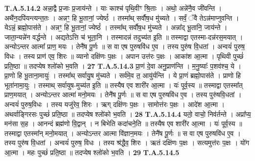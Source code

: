 \documentclass[17pt]{extarticle}
\begin{document}
                  \newline
                                                                  \textbf{ T.A.5.14.2} \newline
                  अन्ना॒द्वै प्र॒जाः प्र॒जाय॑न्ते । याः काश्च॑ पृथि॒वीꣳ श्रि॒ताः । अथो॒ अन्ने॑नै॒व जी॑वन्ति । अथै॑न॒दपि॑यन्त्यन्त॒तः । अन्नꣳ॒॒ हि भू॒तानां॒ ज्येष्ठं᳚ । तस्मा᳚थ् सर्वौष॒ध मु॑च्यते ।  सर्वं॒ ॅवै तेऽन्न॑माप्नुवन्ति । येऽन्नं॒ ब्रह्मो॒पास॑ते । अन्नꣳ॒॒ हि भू॒तानां॒ ज्येष्ठं᳚ । तस्मा᳚थ् सर्वौष॒ध मु॑च्यते । अन्ना᳚द् भू॒तानि॒ जाय॑न्ते । जाता॒न्यन्ने॑न वर्द्धन्ते ।  अद्यतेऽत्ति च॑ भूता॒नि । तस्मादन्नं तदुच्य॑त इ॒ति ॥  तस्माद्वा एतस्मा-दन्न॑रस॒मयात् ।  अन्योऽन्तर आत्मा᳚ प्राण॒ मयः । तेनै॑ष पू॒र्णः ॥  स वा एष पुरुषवि॑ध ए॒व । तस्य पुरु॑ष वि॒धतां ।  अन्वयं॑ पुरुष॒ विधः । तस्य प्राण॑ एव॒ शिरः ॥  व्यानो दक्षि॑णः प॒क्षः । अपान उत्त॑रः प॒क्षः ।  आका॑श आ॒त्मा । पृथिवी पुच्छं॑ प्रति॒ष्ठा ॥  तदप्येष श्लो॑को भ॒वति । \textbf{ 27} \newline
                  \newline
                                                                  \textbf{ T.A.5.14.3} \newline
                  प्रा॒णं दे॒वा अनु॒प्राण॑न्ति । म॒नु॒ष्याः᳚ प॒शव॑श्च॒ ये । प्रा॒णो हि भू॒ताना॒मायुः॑ । तस्मा᳚थ् सर्वायु॒ष मु॑च्यते । सर्व॑मे॒व त॒ आयु॑र्यन्ति ।  ये प्रा॒णं ब्रह्मो॒पास॑ते ।  प्राणो हि भूता॑नामा॒युः । तस्माथ् सर्वायुष-मुच्य॑त इ॒ति ॥ तस्यैष एव शारी॑र आ॒त्मा । यः॑ पूर्व॒स्य ॥  तस्माद्वा एतस्मा᳚त् प्राण॒मयात् । अन्योऽन्तर आत्मा॑ मनो॒मयः । तेनै॑ष पू॒र्णः ॥ स वा एष पुरुषवि॑ध ए॒व । तस्य पुरु॑षवि॒धतां ।  अन्वयं॑ पुरुष॒विधः । तस्य यजु॑रेव॒ शिरः । ऋग् दक्षि॑णः प॒क्षः । सामोत्त॑रः प॒क्षः । आदे॑श आ॒त्मा । अथर्वाङ्गिरसः पुच्छं॑ प्रति॒ष्ठा ॥  तदप्येष श्लो॑को भ॒वति । \textbf{ 28} \newline
                  \newline
                                                                  \textbf{ T.A.5.14.4} \newline
                  यतो॒ वाचो॒ निव॑र्तन्ते । अप्रा᳚प्य॒ मन॑सा स॒ह । आनन्दं ब्रह्म॑णो वि॒द्वान् । न बिभेति कदा॑चने॒ति ॥ तस्यैष एव शारी॑र आ॒त्मा । यः॑ पूर्व॒स्य ॥  तस्माद्वा एतस्मा᳚न् मनो॒मयात् । अन्योऽन्तर आत्मा वि॑ज्ञान॒मयः । तेनै॑ष पू॒र्णः ॥ स वा एष पुरुषवि॑ध ए॒व । तस्य पुरु॑ष वि॒धतां ।  अन्वयं॑ पुरुष॒ विधः । तस्य श्र॑द्धैव॒ शिरः । ऋतं दक्षि॑णः प॒क्षः । सत्यमुत्त॑रः प॒क्षः । यो॑ग आ॒त्मा । महः पुच्छं॑ प्रति॒ष्ठा ॥ तदप्येष श्लो॑को भ॒वति । \textbf{ 29} \newline
                  \newline
                                                                  \textbf{ T.A.5.14.5} \newline
\end{document}
